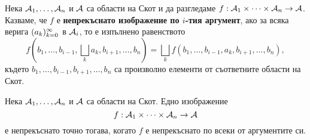 Нека $\mathcal{A}_1,\dots,\mathcal{A}_n$ и $\mathcal{A}$ са области на Скот и да разгледаме $f: \mathcal{A}_1\times \dots \times \mathcal{A}_n \to \mathcal{A}$.
Казваме, че $f$ е {\bf непрекъснато изображение по $i$-тия аргумент}, ако 
за всяка верига $(a_{k})^{\infty}_{k=0}$ в $\mathcal{A}_i$, то е изпълнено равенството
\[f(b_1,\dots, b_{i-1}, \bigsqcup_k a_k, b_{i+1},\dots,b_n) = \bigsqcup_k f(b_1,\dots, b_{i-1}, a_k, b_{i+1},\dots,b_n),\]
където $b_1,\dots,b_{i-1},b_{i+1},\dots,b_{n}$ са произволно елементи от съответните области на Скот.

\begin{proposition}
  \label{pr:continuous-arguments}
  Нека $\mathcal{A}_1,\dots,\mathcal{A}_n$ и $\mathcal{A}$ са области на Скот. Едно изображение
  \[f: \mathcal{A}_1\times \dots \times \mathcal{A}_n \to \mathcal{A}\]
  е непрекъснато точно тогава, когато $f$ е непрекъснато по всеки от аргументите си.
\end{proposition}

